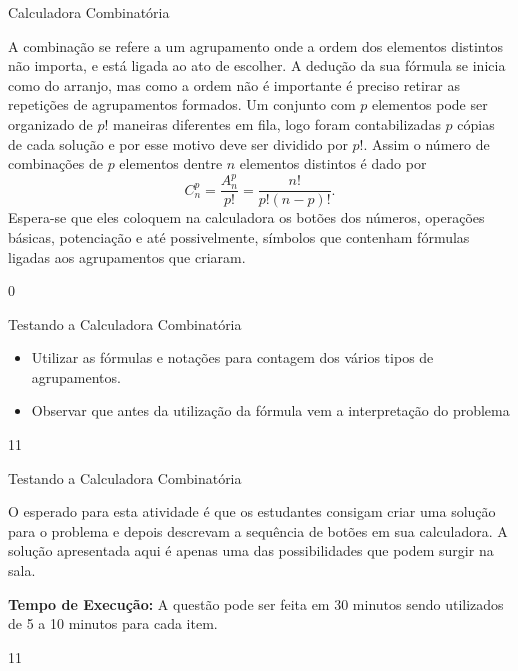 \begin{answer}{Calculadora Combinatória}
{\begin{enumerate}
A combinação se refere a um agrupamento onde a ordem dos elementos distintos não importa, e está ligada ao ato de escolher. 
A dedução da sua fórmula se inicia como do arranjo, mas como a ordem não é importante é preciso retirar as repetições de agrupamentos formados. Um conjunto com $p$ elementos pode ser organizado de $p!$ maneiras diferentes em fila, logo foram contabilizadas $p$ cópias de cada solução e por esse motivo deve ser dividido por $p!$. Assim o número de combinações de $p$ elementos dentre $n$ elementos distintos é dado por
\small
\begin{equation*}
C_n^p=\dfrac{A_n^p}{p!}= \dfrac{n!}{p!(n-p)!}.
\end{equation*}
\normalsize
Espera-se que eles coloquem na calculadora os botões dos números, operações básicas, potenciação e até possivelmente, símbolos que contenham fórmulas ligadas aos agrupamentos que criaram. 
\end{enumerate}
}{0}
\end{answer}
\begin{objectives}{Testando a Calculadora Combinatória}
{
\begin{itemize}
\item Utilizar as fórmulas e notações para contagem dos vários tipos de agrupamentos. 
\item Observar que antes da utilização da fórmula vem a interpretação do problema
\end{itemize}
}{1}{1}
\end{objectives}
\begin{sugestions}{Testando a Calculadora Combinatória}
{
O esperado para esta atividade é que os estudantes consigam criar uma solução para o problema e depois descrevam a sequência de botões em sua calculadora. A solução apresentada aqui é apenas uma das possibilidades que podem surgir na sala. 

\textbf{Tempo de Execução:} A questão pode ser feita em 30  minutos sendo utilizados de 5 a 10 minutos para cada item. 
}{1}{1}
\end{sugestions}
